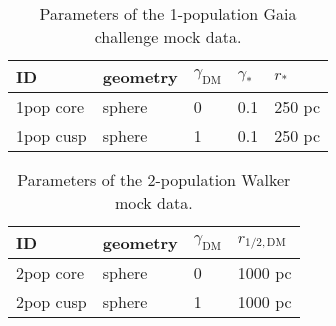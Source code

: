 \begin{table}
    \label{tab:gaia}
    \caption{Parameters of the 1-population Gaia challenge mock data.}
    \centering
    \begin{tabular}{lllll}
        ID & geometry & $\gamma_{\text{DM}}$ & $\gamma_*$ & $r_*$\\
        \hline
        1pop core & sphere & 0 & 0.1 & 250 pc\\ %
        1pop cusp & sphere & 1 & 0.1 & 250 pc\\ %
    \end{tabular}
\end{table}

\begin{table}
    \label{tab:walk}
    \caption{Parameters of the 2-population Walker mock data.}
    \centering
    \begin{tabular}{llll}
        ID & geometry & $\gamma_{\text{DM}}$ & $r_{1/2,\text{DM}}$\\
        \hline
        2pop core & sphere & 0 & 1000 pc \\              %
        2pop cusp & sphere & 1 & 1000 pc\\\hline\hline   %
    \end{tabular}
\end{table}

